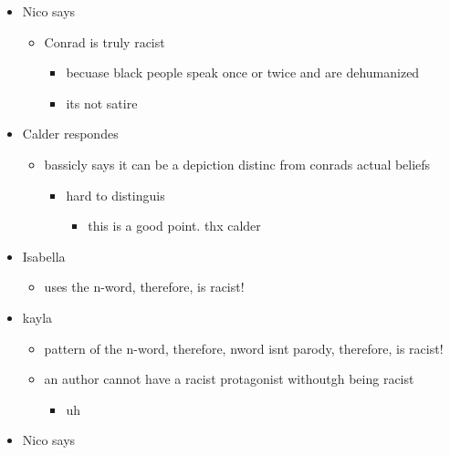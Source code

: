 \documentclass[letterpaper]{article}
\begin{document}
\begin{itemize}
\item Nico says

\begin{itemize}
\item Conrad is truly racist

\begin{itemize}
\item becuase black people speak once or twice and are dehumanized
\item its not satire
\end{itemize}
\end{itemize}

\item Calder respondes

\begin{itemize}
\item bassicly says it can be a depiction distinc from conrads actual
beliefs

\begin{itemize}
\item hard to distinguis

\begin{itemize}
\item this is a good point. thx calder
\end{itemize}
\end{itemize}
\end{itemize}

\item Isabella

\begin{itemize}
\item uses the n-word, therefore, is racist!
\end{itemize}

\item kayla

\begin{itemize}
\item pattern of the n-word, therefore, nword isnt parody, therefore, is
racist!
\item an author cannot have a racist protagonist withoutgh being racist

\begin{itemize}
\item uh
\end{itemize}
\end{itemize}

\item Nico says


\end{itemize}
\end{document}
